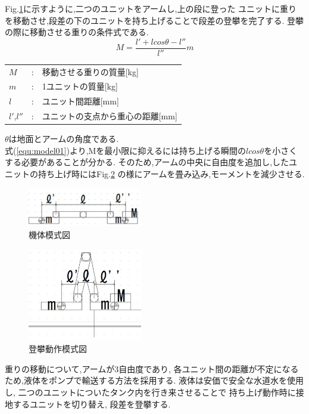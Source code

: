\documentclass[dvipdfmx]{jsarticle}
\begin{document}
Fig.\ref{fig:model01}に示すように,二つのユニットをアームし,上の段に登った
ユニットに重りを移動させ,段差の下のユニットを持ち上げることで段差の登攀を完了する.
登攀の際に移動させる重りの条件式である.
\begin{equation}
  M=\frac{l'+lcos\theta-l''}{l''}m
\label{equ:model01}
\end{equation}
\begin{table}[H]
    \begin{tabular}{lcl}
      $M$ & : & 移動させる重りの質量[kg]\\
      $m$ & : & 1ユニットの質量[kg]\\
      $l$ & : & ユニット間距離[mm]\\
      $l'$,$l''$  & : & ユニットの支点から重心の距離[mm]\\
  \end{tabular}
\end{table}
$\theta$は地面とアームの角度である.\\
式(\ref*{equ:model01})より,Mを最小限に抑えるには持ち上げる瞬間の$lcos\theta$を小さくする必要があることが分かる.
そのため,アームの中央に自由度を追加し,したユニットの持ち上げ時にはFig.\ref{fig:model02}
の様にアームを畳み込み,モーメントを減少させる.
\begin{figure}[H]
  \centering
  \includegraphics[width=50mm]{image/model01.jpg}
  \caption{機体模式図}
\label{fig:model01}
\end{figure}
\begin{figure}[H]
  \centering
  \includegraphics[width=50mm]{image/model02.jpg}
  \caption{登攀動作模式図}
\label{fig:model02}
\end{figure}

重りの移動について,アームが3自由度であり,
各ユニット間の距離が不定になるため,液体をポンプで輸送する方法を採用する.
液体は安価で安全な水道水を使用し,
二つのユニットについたタンク内を行き来させることで
持ち上げ動作時に接地するユニットを切り替え,
段差を登攀する.
\end{document}
